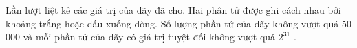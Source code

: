 Lần lượt liệt kê các giá trị của dãy đã cho. Hai phân tử được ghi cách nhau bởi khoảng trắng hoặc dấu xuống dòng. Số lượng phần tử của dãy không vượt quá 50 000 và mỗi phần tử của dãy có giá trị tuyệt đối không vượt quá $2^{31}$   .